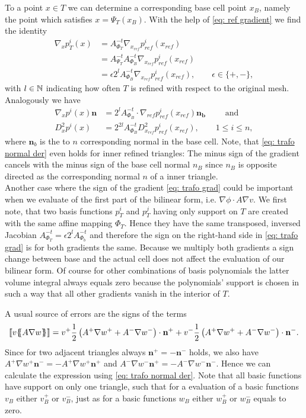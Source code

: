 \begin{example}
 To a point $x \in T$ we can determine a corresponding base cell point $x_B$, namely the point which satisfies $x = \Psi_T(x_B)$. With the help of \eqref{eq: ref gradient} we find the identity
\begin{align}
\nabla_x p_T^i(x) &= A_{\Phi_T}^{-t} \nabla_{x_{ref}} p^i_{ref} (x_{ref}) \nonumber\\
 &= A_{\Psi_T}^{-t} A_{\Phi_B}^{-t} \nabla_{x_{ref}} p^i_{ref} (x_{ref}) \nonumber\\
&= \epsilon 2^l A_{\Phi_B}^{-t} \nabla_{x_{ref}} p^i_{ref}(x_{ref}), \qquad \epsilon \in \{+,-\} \label{eq: trafo grad},
\end{align}
with $l \in \mathbb{N}$ indicating how often $T$ is refined with respect to the original mesh.\\
Analogously we have
\begin{align}
\nabla_x p^i(x) \mathbf n &= 2^l  A_{\Phi_B}^{-t} \cdot \nabla_{ref}p^i_{ref}(x_{ref}) \mathbf{ n_{b}} \qquad \text{ and } \label{eq: trafo normal der} \\
D_x^2 p^i(x) &= 2^{2l}  A_{\Phi_B}^{-t} D_{x_{ref}}^2 p^i_{ref}(x_{ref}), \qquad 1 \leq i \leq n,
\end{align}
where $\mathbf n_b$ is the to $n$ corresponding normal in the base cell. Note, that \eqref{eq: trafo normal der} even holds for inner refined triangles: The minus sign of the gradient cancels with the minus sign of the base cell normal $n_B$ since $n_B$ is opposite directed as the corresponding normal $n$ of a inner triangle.\\
Another case where the sign of the gradient \eqref{eq: trafo grad} could be important when we evaluate of the first part of the bilinear form, i.e. $\nabla \phi \cdot A \nabla v$. We first note, that two basis functions $p_T^i$ and $p_T^j$ having only support on $T$ are created with the same affine mapping $\Phi_T$. Hence they have the same transposed, inversed Jacobian $A^{-t}_{\Phi_T}=\epsilon 2^l A_{\Phi_b}^{-t}$ and therefore the sign on the right-hand side in \eqref{eq: trafo grad} is for both gradients the same. Because we multiply both gradients a sign change between base and the actual cell does not affect the evaluation of our bilinear form. 
Of course for other combinations of basis polynomials the latter volume integral always equals zero because the polynomials' support is chosen in such a way that all other gradients vanish in the interior of $T$.

A usual source of errors are the signs of the terms
\[
	\llbracket v \{\!\!\{  A \nabla w  \}\!\!\} \rrbracket = v^+ \frac 1 2  \left(A^+ \nabla w^+ + A^- \nabla w^-\right) \cdot \mathbf n^+ + v^- \frac 1 2 \left(A^+ \nabla w^+ + A^- \nabla w^-\right) \cdot \mathbf n^-.
\]
Since for two adjacent triangles always $\mathbf n^+ = - \mathbf n^-$ holds, we also have $A^+ \nabla w^+ \mathbf n^-= -A^+ \nabla w^+ \mathbf n^+$ and $A^- \nabla w^- \mathbf n^+= -A^- \nabla w^- \mathbf n^-$. Hence we can calculate the expression using \eqref{eq: trafo normal der}. Note that all basic functions have support on only one triangle, such that for a evaluation of a basic functions $v_B$ either $v_B^+$ or $v_B^-$, just as for a basic functions $w_B$ either $w_B^+$ or $w_B^-$ equals to zero.


\end{example}
